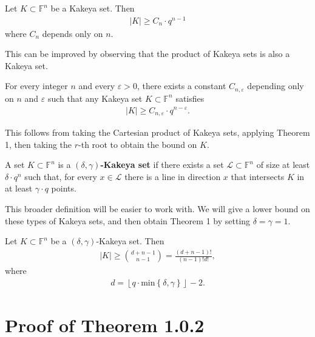 \documentclass{memoir}
\begin{document}
\begin{thm}
	Let \(K\subset \mathbb{F}^{n}\) be a Kakeya set. Then
	\begin{align*}
		\left| K \right| \geq C_n\cdot q^{n-1}
	\end{align*}
	where \(C_n\) depends only on \(n\).
\end{thm}
This can be improved by observing that the product of Kakeya sets is also a Kakeya set.

\begin{cor}
	For every integer \(n\) and every \(\varepsilon>0\), there exists a constant  \(C_{n,\varepsilon}\) depending only on \(n\) and \(\varepsilon\) such that any Kakeya set \(K\subset \mathbb{F}^{n}\) satisfies
	\begin{align*}
		\left| K \right| \geq C_{n,\varepsilon }\cdot q^{n-\varepsilon}.
	\end{align*}
\end{cor}
This follows from taking the Cartesian product of Kakeya sets, applying Theorem 1, then taking the \(r\)-th root to obtain the bound on \(K\).

\begin{defn}
	A set \(K\subset \mathbb{F}^{n}\) is a \textbf{\((\delta ,\gamma )\)-Kakeya set} if there exists a set \(\mathcal{L}\subset \mathbb{F}^{n}\) of size at least  \(\delta \cdot q^{n}\) such that, for every \(x \in \mathcal{L}\) there is a line in direction \(x\) that intersects \(K\) in at least \(\gamma \cdot q\) points.
\end{defn}
This broader definition will be easier to work with. We will give a lower bound on these types of Kakeya sets, and then obtain Theorem 1 by setting \(\delta =\gamma =1\).

\begin{thm}
	Let \(K\subset \mathbb{F}^{n}\) be a \((\delta ,\gamma )\)-Kakeya set. Then
	\begin{align*}
		\left| K \right| \geq {{d+n-1}\choose{n-1}} = \frac{(d+n-1)!}{(n-1)!d!},
	\end{align*}
	where
	\begin{align*}
		d = \left\lfloor q \cdot \textrm{min}\left\{ \delta ,\gamma  \right\}  \right\rfloor - 2.
	\end{align*}
\end{thm}

\section{Proof of Theorem 1.0.2}
\label{sec:proof_of_theorem_1_0_2}
\end{document}
